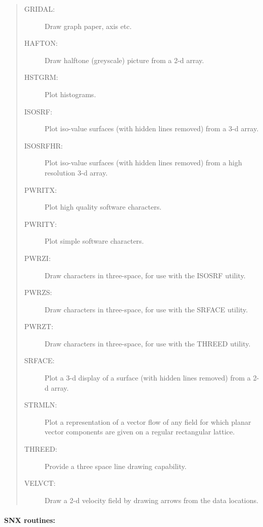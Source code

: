 \begin{quote}
\begin{description}
\item [GRIDAL:] 
 Draw graph paper, axis etc.
\item [HAFTON:] 
 Draw halftone (greyscale) picture from a 2-d array.
\item [HSTGRM:] 
 Plot histograms.
\item [ISOSRF:] 
 Plot iso-value surfaces (with hidden lines removed) from a 3-d array.
\item [ISOSRFHR:] 
 Plot iso-value surfaces (with hidden lines removed) from a high resolution
 3-d array.
\item [PWRITX:] 
 Plot high quality software characters.
\item [PWRITY:] 
 Plot simple software characters.
\item [PWRZI:] 
 Draw characters in three-space, for use with the ISOSRF utility.
\item [PWRZS:] 
 Draw characters in three-space, for use with the SRFACE utility.
\item [PWRZT:] 
 Draw characters in three-space, for use with the THREED utility.
\item [SRFACE:] 
 Plot a 3-d display of a surface (with hidden lines removed) from a 2-d array.
\item [STRMLN:] 
 Plot a representation of a vector flow of any field for which planar vector
 components are given on a regular rectangular lattice.
\item [THREED:] 
 Provide a three space line drawing capability.
\item [VELVCT:] 
 Draw a 2-d velocity field by drawing arrows from the data
 locations.
\end{description}
\end{quote}

\newpage

\paragraph{SNX routines:}


